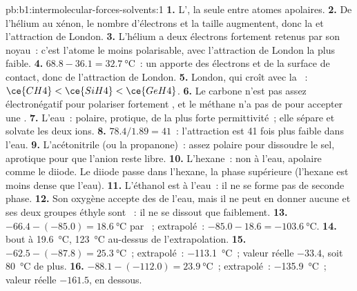\begin{solution}{pb:b1:intermolecular-forces-solvents:1}
\textbf{1.} L', la seule entre atomes apolaires.
\textbf{2.} De l'hélium au xénon, le nombre d'électrons et la taille
augmentent, donc la  et l'attraction de London.
\textbf{3.} L'hélium a deux électrons fortement retenus par son noyau~:
c'est l'atome le moins polarisable, avec l'attraction de London la plus
faible.
\textbf{4.} $68.8 - 36.1 = \qty{32.7}{\celsius}$~: un  apporte
des électrons et de la surface de contact, donc de l'attraction de
London.
\textbf{5.} London, qui croît avec la ~: $\ce{CH4} < \ce{SiH4} <
\ce{GeH4}$.
\textbf{6.} Le carbone n'est pas assez électronégatif pour polariser
fortement , et le méthane n'a pas de  pour
accepter une .
\textbf{7.} L'eau~: polaire, protique, de la plus forte permittivité~;
elle sépare et solvate les deux ions.
\textbf{8.} $78.4/1.89 = 41$~: l'attraction est 41 fois plus faible dans
l'eau.
\textbf{9.} L'acétonitrile (ou la propanone)~: assez polaire pour
dissoudre le sel, aprotique pour que l'anion reste libre.
\textbf{10.} L'hexane~: non  à l'eau, apolaire comme le diiode.
Le diiode passe dans l'hexane, la phase supérieure (l'hexane est moins
dense que l'eau).
\textbf{11.} L'éthanol est  à l'eau~: il ne se forme pas de
seconde phase.
\textbf{12.} Son oxygène accepte des  de l'eau, mais il
ne peut en donner aucune et ses deux groupes éthyle sont ~: il
ne se dissout que faiblement.
\textbf{13.} $-66.4 - (-85.0) = \qty{18.6}{\celsius}$ par ~;
 extrapolé~: $-85.0 - 18.6 = \qty{-103.6}{\celsius}$.
\textbf{14.}  bout à \qty{19.6}{\celsius}, \qty{123}{\celsius}
au-dessus de l'extrapolation.
\textbf{15.} $-62.5 - (-87.8) = \qty{25.3}{\celsius}$~; 
extrapolé~: \qty{-113.1}{\celsius}~; valeur réelle $-33.4$, soit
\qty{80}{\celsius} de plus.
\textbf{16.} $-88.1 - (-112.0) = \qty{23.9}{\celsius}$~; 
extrapolé~: \qty{-135.9}{\celsius}~; valeur réelle $-161.5$, en dessous.

\end{solution}
